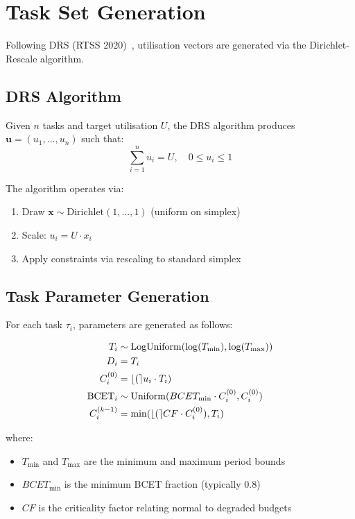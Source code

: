 
\section{Task Set Generation}
\label{sec:task-set-generation}

Following DRS (RTSS 2020)~\cite{1a02ee59d96a4af497808eeb685b574c}, utilisation vectors are generated via the Dirichlet-Rescale algorithm.

\subsection{DRS Algorithm}

Given $n$ tasks and target utilisation $U$, the DRS algorithm produces $\mathbf{u} = (u_1, \dots, u_n)$ such that:
\[
\sum_{i=1}^n u_i = U, \quad 0 \leq u_i \leq 1
\]

The algorithm operates via:
\begin{enumerate}
    \item Draw $\mathbf{x} \sim \mathrm{Dirichlet}(1, \dots, 1)$ (uniform on simplex)
    \item Scale: $u_i = U \cdot x_i$
    \item Apply constraints via rescaling to standard simplex
\end{enumerate}

\subsection{Task Parameter Generation}

For each task $\tau_i$, parameters are generated as follows:

\begin{align*}
T_i &\sim \mathrm{LogUniform}(\log(T_{\min}), \log(T_{\max})) \\
D_i &= T_i \\
C_i^{(0)} &= \lfloor ( \rceil u_i \cdot T_i) \\
\mathrm{BCET}_i &\sim \mathrm{Uniform}(BCET_{\mathrm{min}} \cdot C_i^{(0)}, C_i^{(0)}) \\
C_i^{(k-1)} &= \min(\lfloor ( \rceil CF \cdot C_i^{(0)}), T_i)
\end{align*}

where:
\begin{itemize}
    \item $T_{\min}$ and $T_{\max}$ are the minimum and maximum period bounds
    \item $BCET_{\mathrm{min}}$ is the minimum BCET fraction (typically $0.8$)
    \item $CF$ is the criticality factor relating normal to degraded budgets
\end{itemize}

